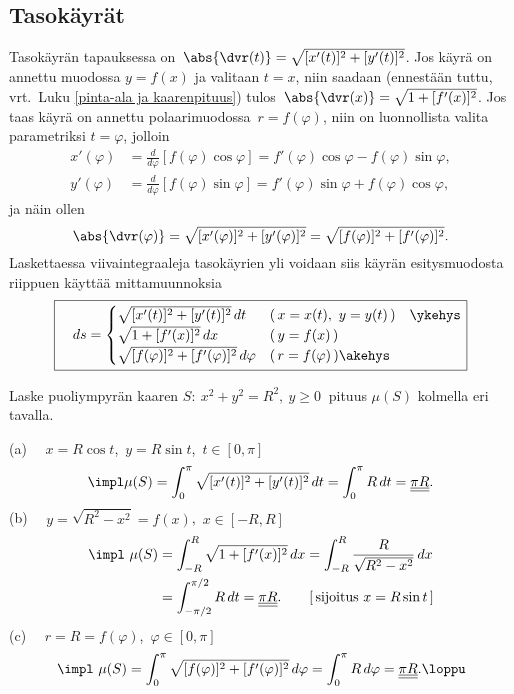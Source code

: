\subsection{Tasokäyrät}

Tasokäyrän tapauksessa on $\,\abs{\dvr(t)}=\sqrt{[x'(t)]^2+[y'(t)]^2}$.
Jos käyrä on annettu muodossa $y=f(x)$ ja valitaan $t=x$, niin saadaan 
(ennestään tuttu, vrt.\ Luku \ref{pinta-ala ja kaarenpituus}) tulos
$\,\abs{\dvr(x)}=\sqrt{1+[f'(x)]^2}$. Jos taas käyrä on annettu polaarimuodossa
$\,r=f(\varphi)$, niin on luonnollista valita parametriksi $t=\varphi$, jolloin
\begin{align*}
x'(\varphi) &= \frac{d}{d\varphi}[f(\varphi)\cos\varphi]
             = f'(\varphi)\cos\varphi-f(\varphi)\sin\varphi, \\
y'(\varphi) &= \frac{d}{d\varphi}[f(\varphi)\sin\varphi]
             = f'(\varphi)\sin\varphi+f(\varphi)\cos\varphi,
\end{align*}
ja näin ollen
\[
\abs{\dvr(\varphi)}=\sqrt{[x'(\varphi)]^2+[y'(\varphi)]^2}
                   =\sqrt{[f(\varphi)]^2+[f'(\varphi)]^2}.
\]
Laskettaessa viivaintegraaleja tasokäyrien yli voidaan siis käyrän esitysmuodosta riippuen
käyttää mittamuunnoksia
%
\[ \boxed{
\quad ds=\begin{cases}
\sqrt{[x'(t)]^2+[y'(t)]^2}\,dt &(\,x=x(t), \ y=y(t)\,) \quad\ykehys \\
\sqrt{1+[f'(x)]^2}\,dx &(\,y=f(x)\,) \\
\sqrt{[f(\varphi)]^2+[f'(\varphi)]^2}\,d\varphi &(\,r=f(\varphi)\,) \akehys
\end{cases} } \]
\begin{Exa}
Laske puoliympyrän kaaren $S:\ x^2+y^2=R^2,\ y \ge 0\ $ pituus $\mu(S)$ kolmella eri tavalla.
\end{Exa}
\ratk
(a) \ \, $x=R\cos t$, $\,y=R\sin t$, $\,t\in [0,\pi]$
\[
\impl \mu(S)=\int_0^\pi \sqrt{[x'(t)]^2+[y'(t)]^2}\,dt
            =\int_0^\pi R\,dt=\underline{\underline{\pi R}}.
\]
(b) \ \, $y=\sqrt{R^2-x^2}=f(x)$, $\,x\in [-R,R]$
\begin{align*}
\impl \ \mu(S) &= \int_{-R}^R \sqrt{1+[f'(x)]^2}\,dx=\int_{-R}^R \frac{R}{\sqrt{R^2-x^2}}\,dx \\
               &= \int_{-\pi/2}^{\pi/2} R\,dt
                = \underline{\underline{\pi R}}. \qquad [\,\text{sijoitus}\ x=R\sin t\,]
\end{align*}
(c) \ \, $r=R=f(\varphi)$, $\,\varphi\in [0,\pi]$
\[
\impl \ \mu(S)=\int_0^\pi \sqrt{[f(\varphi)]^2+[f'(\varphi)]^2}\,d\varphi
              =\int_0^\pi R\,d\varphi=\underline{\underline{\pi R}}. \loppu
\]

